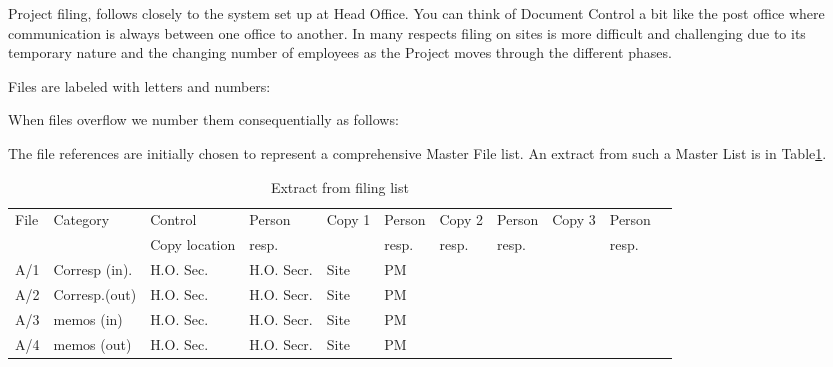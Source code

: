 Project filing, follows closely to the system set up at Head Office. You can think of Document Control a bit like the post office where communication is always between one office to another. In many respects filing on sites is more difficult and challenging due to its temporary nature and the changing number of employees as the Project moves through the different phases.

Files are labeled with letters and numbers:

\begin{center}
\end{center}
        
When files overflow we number them consequentially as follows:

\begin{center}
\end{center}

The file references are initially chosen to represent a comprehensive Master File list. An extract from such a Master List is in Table\ref{masterlist}.


\begin{fullwidth}
\begin{table}[htb]
\vspace{0.5cm}

\small
\hskip-10pt\begin{tabular}{|l|l|l|l||l|l||l|l||l|l|l|}
\hline
File &Category        &Control              & Person       &Copy 1  &Person        &Copy 2        &Person      &Copy 3 &Person\\
     &                &Copy location        & resp. &        &resp.   &resp.   &resp. &      &resp.\\
\hline
A/1    & Corresp (in).       & H.O. Sec.           & H.O. Secr. & Site & PM           &              &            &      & \\
A/2    & Corresp.(out)       & H.O. Sec.           & H.O. Secr. & Site & PM           &              &            &      & \\
A/3    & memos (in)          & H.O. Sec.           & H.O. Secr. & Site & PM           &              &            &      & \\
A/4    & memos (out)         & H.O. Sec.           & H.O. Secr. & Site & PM           &              &            &      & \\
\hline
\end{tabular} 	
\caption{Extract from filing list}
\label{masterlist}
\end{table}
\end{fullwidth}

